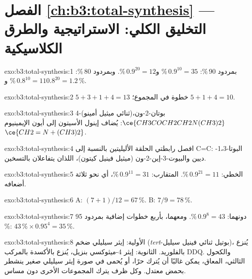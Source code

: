 \section*{الفصل \ref{ch:b3:total-synthesis} --- التخليق الكلي: الاستراتيجية والطرق الكلاسيكية}

\begin{solution}{exo:b3:total-synthesis:1}
بمردود 90\,\%: $0.9^{10} = 35$\,\% و$0.9^{20} = 12$\,\%. وبمردود 80\,\%: $0.8^{10} = 11$\,\% و$0.8^{20} = 1.2$\,\%.
\end{solution}

\begin{solution}{exo:b3:total-synthesis:2}
$5 + 3 + 1 + 4 = 13$ خطوة في المجموع؛  $5 + 1 + 4 = 10$.
\end{solution}

\begin{solution}{exo:b3:total-synthesis:3}
4-(ثنائي ميثيل أمينو)بوتان-2-ون، $\ce{CH3COCH2CH2N(CH3)2}$: يُضاف إينول الأسيتون إلى أيون
الإيمينيوم $\ce{CH2=N+(CH3)2}$.
\end{solution}

\begin{solution}{exo:b3:total-synthesis:4}
افصل رابطتي الحلقة الأليليتين بالنسبة إلى C=C: البوتا-1،3-ديين والبيوت-3-إين-2-ون
(ميثيل فينيل كيتون)، اللذان يتفاعلان بالتسخين.
\end{solution}

\begin{solution}{exo:b3:total-synthesis:5}
الخطي: $0.9^{21} = 11$\,\%. المتقارب: $0.9^{11} = 31$\,\%، أي نحو ثلاثة أضعافه.
\end{solution}

\begin{solution}{exo:b3:total-synthesis:6}
A: $(7 + 1)/12 = 67$\,\%. B: $7/9 = 78$\,\%.
\end{solution}

\begin{solution}{exo:b3:total-synthesis:7}
دونهما: $0.9^8 = 43$\,\%. ومعهما، بأربع خطوات إضافية بمردود 95\,\%: $43\,\% \times 0.95^4 = 35$\,\%.
\end{solution}

\begin{solution}{exo:b3:total-synthesis:8}
الأولية: إيثر سيليلي ضخم (\textit{tert}-بوتيل ثنائي فينيل سيليل)، يُنزع بالفلوريد.
الثانوية: إيثر 4-ميثوكسي بنزيل، يُنزع بالأكسدة بالمركب DDQ. والكحول الثالثي،
المعاق، يمكن غالبًا أن يُترك حرًا، أو يُحمى في صورة إيثر سيليلي صغير
ينشطر بحمض معتدل. وكل ظرف يترك المجموعات الأخرى دون مساس.
\end{solution}

